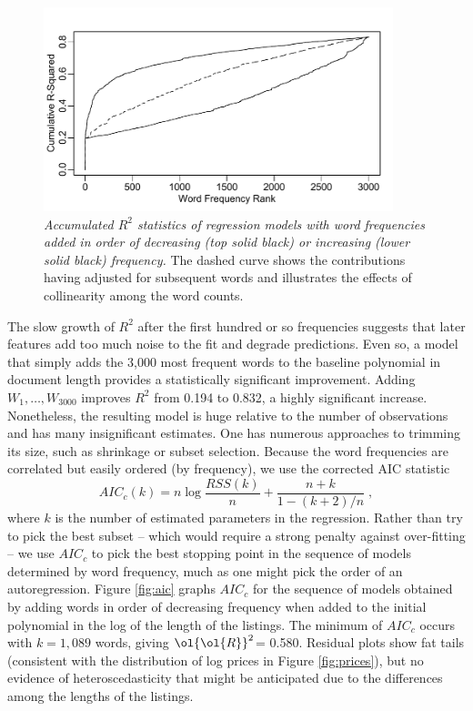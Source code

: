 \documentclass[12pt]{article}
\newcommand{\prs}{\mbox{$\ol{\ol{R}}^2$}}
\begin{document}
\begin{figure}
\caption{ \label{fig:cumr2} 
{\sl Accumulated $R^2$ statistics of regression models with word frequencies
 added in order of decreasing (top solid black) or increasing (lower solid
 black) frequency.} The dashed curve shows the contributions having adjusted for
 subsequent words and illustrates the effects of collinearity among the word
 counts.}  
 \centerline{ \includegraphics[width=4in]{figures/cumr2.pdf} }
\end{figure}


 The slow growth of $R^2$ after the first hundred or so frequencies suggests
 that later features add too much noise to the fit and degrade predictions.  
 Even so, a model that simply adds the 3,000 most frequent words to
 the baseline polynomial in document length provides a statistically significant 
 improvement. Adding
 $W_1,\ldots,W_{3000}$ improves $R^2$ from 0.194 to 0.832, a highly significant
 increase.  Nonetheless, the resulting model is huge relative to the number of
 observations and has many insignificant estimates.  One has numerous approaches
 to trimming its size, such as shrinkage or subset selection.  Because the word
 frequencies are correlated but easily ordered (by frequency), we use the
 corrected AIC statistic \citep{hurvich89}
 \begin{equation}
    AIC_{c}(k) = n \log \frac{RSS(k)}{n} + \frac{n+k}{1-(k+2)/n} \;,
 \end{equation}
 where $k$ is the number of estimated parameters in the regression.  Rather than
 try to pick the best subset -- which would require a strong penalty against
 over-fitting -- we use $AIC_c$ to pick the best stopping point in the 
 sequence of models determined by word frequency, much as one might pick the
 order of an autoregression.  Figure \ref{fig:aic} graphs $AIC_c$ for the
 sequence of models obtained by adding words in order of decreasing frequency
 when added to the initial polynomial in the log of the length of the listings.
  The minimum of $AIC_c$ occurs with $k=1,089$ words, giving \prs = 0.580.
  Residual plots show fat tails (consistent with the distribution of log prices
 in Figure \ref{fig:prices}), but no evidence of heteroscedasticity that might
 be anticipated due to the differences among the lengths of the listings.
\end{document}
